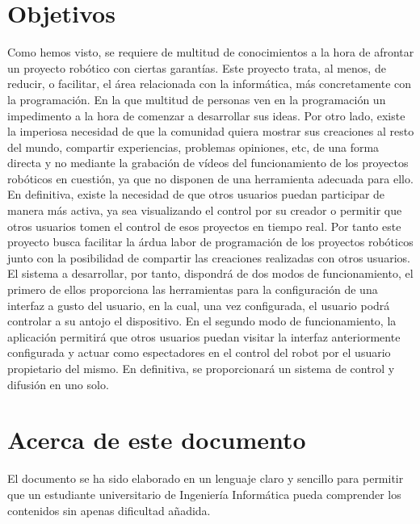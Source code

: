 


\section{Objetivos}
\label{sec:objetivos}

Como hemos visto, se requiere de multitud de conocimientos a la hora de afrontar un proyecto robótico con ciertas garantías. Este proyecto trata, al menos, de reducir, o facilitar, el área relacionada con
la informática, más concretamente con la programación. En la que multitud de personas ven en la programación un impedimento a la hora de comenzar a desarrollar sus ideas.
Por otro lado, existe la imperiosa necesidad de que la comunidad quiera mostrar sus creaciones al resto del mundo, compartir experiencias, problemas opiniones, etc, de una forma directa y no
mediante la grabación de vídeos del funcionamiento de los proyectos robóticos en cuestión, ya que no disponen de una herramienta adecuada para ello. En definitiva, existe la necesidad de que otros
usuarios puedan participar de manera más activa, ya sea visualizando el control por su creador o permitir que otros usuarios tomen el control de esos proyectos en tiempo real.
Por tanto este proyecto busca facilitar la árdua labor de programación de los proyectos robóticos junto con la posibilidad de compartir las creaciones realizadas con otros usuarios.\\

El sistema a desarrollar, por tanto, dispondrá de dos modos de funcionamiento, el primero de ellos proporciona las herramientas para la configuración de una interfaz a gusto del usuario, en la cual, 
una vez configurada, el usuario podrá controlar a su antojo el dispositivo. En el segundo modo de funcionamiento, la aplicación permitirá que otros usuarios puedan visitar la interfaz anteriormente 
configurada y actuar como espectadores en el control del robot por el usuario propietario del mismo. En definitiva, se proporcionará un sistema de control y difusión en uno solo.\\

\section{Acerca de este documento}

El documento se ha sido elaborado en un lenguaje claro y sencillo para permitir que un estudiante universitario de Ingeniería Informática pueda comprender los contenidos sin apenas dificultad añadida.\\


